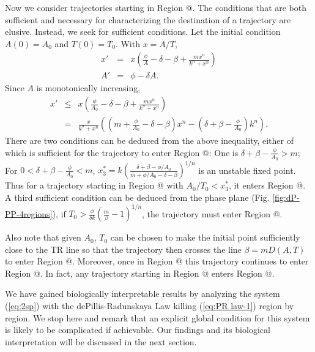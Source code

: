 \documentclass[review,authoryear]{elsarticle}
\makeatletter
\newcommand*{\rom}[1]{\expandafter\@slowromancap\romannumeral #1@}
\makeatother
\begin{document}
Now we consider trajectories starting in Region \rom{3}.  The conditions that are both sufficient and necessary for characterizing the destination of a trajectory are elusive.
Instead, we seek for sufficient conditions. Let the initial condition $A(0)=A_0$ and $T(0)=T_0$.
With $x=A/T$, 
\begin{eqnarray*}
x' & = & x(\frac{\phi}{A}-\delta-\beta+\frac{mx^{n}}{k^{n}+x^{n}})\\
A' & = & \phi-\delta A.
\end{eqnarray*}
Since $A$ is monotonically increasing,
\begin{eqnarray*}
x' & \le & x(\frac{\phi}{A_{0}}-\delta-\beta+\frac{mx^{n}}{k^{n}+x^{n}})\\
   & = & \frac{x}{k^{n}+x^{n}}((m+\frac{\phi}{A_{0}}-\delta-\beta)x^{n}-(\delta+\beta-\frac{\phi}{A_{0}})k^{n}).
\end{eqnarray*}
There are two conditions can be deduced from the above inequality, either of which is sufficient for the trajectory
to enter Region \rom{2}: One is $\delta+\beta-\frac{\phi}{A_{0}}>m$; For $0<\delta+\beta-\frac{\phi}{A_{0}}<m$,
$x_{3}^{*}=k(\frac{\delta+\beta-\phi/A_{0}}{m+\phi/A_{0}-\delta-\beta})^{1/n}$ is an unstable fixed point. Thus for a trajectory starting in Region \rom{3} with $A_0/T_0<x_{3}^{*}$,
it enters Region \rom{2}. A third sufficient condition can be deduced from the phase plane (Fig. \ref{fig:dP-PP-4regions}), if $T_0>\frac{\phi}{\delta k}(\frac{m}{\beta}-1)^{1/n}$, the trajectory must enter Region \rom{2}. 

Also note that given $A_0$, $T_0$ can be chosen to make the initial point sufficiently close to the TR line so that the trajectory then crosses the line $\beta=mD(A,T)$
to enter Region \rom{4}. Moreover, once in Region \rom{4} this trajectory continues to enter Region \rom{1}. In fact, any trajectory starting in Region \rom{4} enters Region \rom{1}. 

We have gained biologically interpretable results by analyzing the system (\ref{eq:2sp}) with the dePillis-Radunskaya Law killing (\ref{eq:PR law-1}) region by region. We stop here and remark that an explicit global condition for this system is likely to be complicated if achievable.  Our findings and its biological interpretation will be discussed in the next section.
\end{document}
